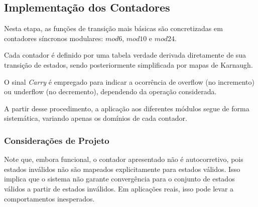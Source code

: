 \subsection{Implementação dos Contadores}

Nesta etapa, as funções de transição mais básicas são concretizadas em contadores síncronos modulares: $mod6$, $mod10$ e $mod24$.

Cada contador é definido por uma tabela verdade derivada diretamente de sua transição de estados, sendo posteriormente simplificada por mapas de Karnaugh.

O sinal \textit{Carry} é empregado para indicar a ocorrência de overflow (no incremento) ou underflow (no decremento), dependendo da operação considerada.

A partir desse procedimento, a aplicação aos diferentes módulos segue de forma sistemática, variando apenas os domínios de cada contador.





\subsubsection{Considerações de Projeto}

Note que, embora funcional, o contador apresentado não é autocorretivo, pois estados inválidos não são mapeados explicitamente para estados válidos. Isso implica que o sistema não garante convergência para o conjunto de estados válidos a partir de estados inválidos. Em aplicações reais, isso pode levar a comportamentos inesperados.

